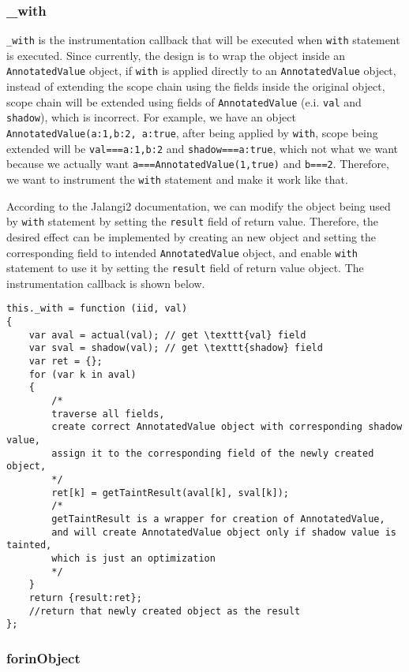 {{{{\subsubsection{_with}

\texttt{_with} is the instrumentation callback that will be executed when \texttt{with} statement is executed. Since currently, the design is to wrap the object inside an \texttt{AnnotatedValue} object, if \texttt{with} is applied directly to an \texttt{AnnotatedValue} object, instead of extending the scope chain using the fields inside the original object, scope chain will be extended using fields of \texttt{AnnotatedValue} (e.i. \texttt{val} and \texttt{shadow}), which is incorrect. For example, we have an object \texttt{AnnotatedValue({a:1,b:2}, {a:true}}, after being applied by \texttt{with}, scope being extended will be \texttt{val==={a:1,b:2}} and \texttt{shadow==={a:true}}, which not what we want because we actually want \texttt{a===AnnotatedValue(1,true)} and \texttt{b===2}. Therefore, we want to instrument the \texttt{with} statement and make it work like that.

According to the Jalangi2 documentation, we can modify the object being used by \texttt{with} statement by setting the \texttt{result} field of return value. Therefore, the desired effect can be implemented by creating an new object and setting the corresponding field to intended \texttt{AnnotatedValue} object, and enable \texttt{with} statement to use it by setting the \texttt{result} field of return value object. The instrumentation callback is shown below.

\begin{verbatim}
this._with = function (iid, val)
{
    var aval = actual(val); // get \texttt{val} field
    var sval = shadow(val); // get \texttt{shadow} field
    var ret = {};
    for (var k in aval)
    {
        /*
        traverse all fields,
        create correct AnnotatedValue object with corresponding shadow value,
        assign it to the corresponding field of the newly created object,
        */
        ret[k] = getTaintResult(aval[k], sval[k]);
        /*
        getTaintResult is a wrapper for creation of AnnotatedValue,
        and will create AnnotatedValue object only if shadow value is tainted,
        which is just an optimization
        */
    }
    return {result:ret};
    //return that newly created object as the result
};
\end{verbatim}

\subsubsection{forinObject}

}}}}
